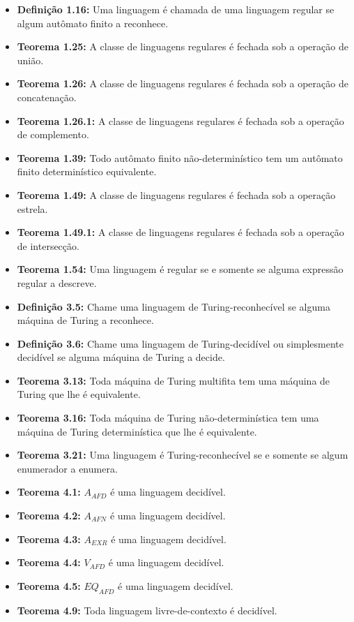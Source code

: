 \documentclass[12pt,a4paper,oneside]{article}
\begin{document}
\begin{itemize}
	
	\item[] {\bf Definição 1.16:} Uma linguagem é chamada de uma linguagem regular se algum autômato finito a reconhece.
	\item[] {\bf Teorema 1.25:} A classe de linguagens regulares é fechada sob a operação de união.
	\item[] {\bf Teorema 1.26:} A classe de linguagens regulares é fechada sob a operação de concatenação.
	\item[] {\bf Teorema 1.26.1:} A classe de linguagens regulares é fechada sob a operação de complemento.
	\item[] {\bf Teorema 1.39:} Todo autômato finito não-determinístico tem um autômato finito determinístico
	equivalente.
	\item[] {\bf Teorema 1.49:} A classe de linguagens regulares é fechada sob a operação estrela.
	\item[] {\bf Teorema 1.49.1:} A classe de linguagens regulares é fechada sob a operação de intersecção.
	\item[] {\bf Teorema 1.54:} Uma linguagem é regular se e somente se alguma expressão regular a descreve.
	\item[] {\bf Definição 3.5:} Chame uma linguagem de Turing-reconhecível se alguma máquina de Turing a reconhece.
	\item[] {\bf Definição 3.6:} Chame uma linguagem de Turing-decidível ou simplesmente decidível se alguma máquina de Turing a decide.
	\item[] {\bf Teorema 3.13:} Toda máquina de Turing multifita tem uma máquina de Turing que lhe é equivalente.
	\item[] {\bf Teorema 3.16:} Toda máquina de Turing não-determinística tem uma máquina de Turing determinística que lhe é equivalente.
	\item[] {\bf Teorema 3.21:} Uma linguagem é Turing-reconhecível se e somente se algum enumerador a enumera.
	\item[] {\bf Teorema 4.1:} $A_{AFD}$ é uma linguagem decidível.
	\item[] {\bf Teorema 4.2:} $A_{AFN}$ é uma linguagem decidível.
	\item[] {\bf Teorema 4.3:} $A_{EXR}$ é uma linguagem decidível.
	\item[] {\bf Teorema 4.4:} $V_{AFD}$ é uma linguagem decidível.
	\item[] {\bf Teorema 4.5:} $EQ_{AFD}$ é uma linguagem decidível.
	\item[] {\bf Teorema 4.9:} Toda linguagem livre-de-contexto é decidível.

\end{itemize}
\end{document}
